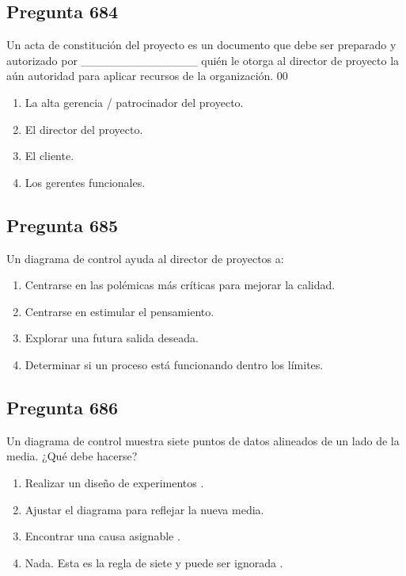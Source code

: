 \documentclass[11pt,a4paper]{article}
\begin{document}
\subsection*{Pregunta 684}
Un acta de constitución del proyecto es un documento que debe ser preparado y autorizado por \_\_\_\_\_\_\_\_\_\_\_\_\_\_ quién le otorga al director de proyecto la aún autoridad para aplicar recursos de la organización. 00

\begin{enumerate}[label=\alph*)]
  \item La alta gerencia / patrocinador del proyecto.
  \item El director del proyecto.
  \item El cliente.
  \item Los gerentes funcionales.
\end{enumerate}

\subsection*{Pregunta 685}
Un diagrama de control ayuda al director de proyectos a:

\begin{enumerate}[label=\alph*)]
  \item Centrarse en las polémicas más críticas para mejorar la calidad.
  \item Centrarse en estimular el pensamiento.
  \item Explorar una futura salida deseada.
  \item Determinar si un proceso está funcionando dentro los límites.
\end{enumerate}

\subsection*{Pregunta 686}
Un diagrama de control muestra siete puntos de datos alineados de un lado de la media. ¿Qué debe hacerse?

\begin{enumerate}[label=\alph*)]
  \item Realizar un diseño de experimentos .
  \item Ajustar el diagrama para reflejar la nueva media.
  \item Encontrar una causa asignable .
  \item Nada. Esta es la regla de siete y puede ser ignorada .
\end{enumerate}
\end{document}
